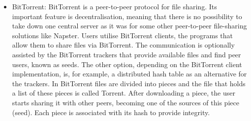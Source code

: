 \begin{itemize}
    \item BitTorrent: BitTorrent is a peer-to-peer protocol for file sharing. Its important feature is decentralisation, meaning that there is no possibility to take down one central server as it was for some other peer-to-peer file-sharing solutions like Napster. Users utilise BitTorrent clients, the programs that allow them to share files via BitTorrent. The communication is optionally assisted by the BitTorrent trackers that provide available files and find peer users, known as seeds. The other option, depending on the BitTorrent client implementation, is, for example, a distributed hash table as an alternative for the trackers. In BitTorrent files are divided into pieces and the file that holds a list of these pieces is called Torrent. After downloading a piece, the user starts sharing it with other peers, becoming one of the sources of this piece (seed). Each piece is associated with its hash to provide integrity.
\end{itemize}
